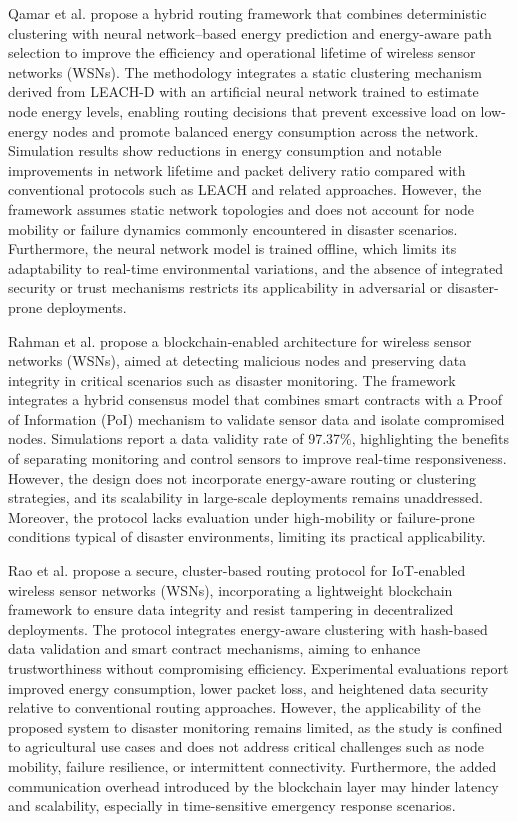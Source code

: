 Qamar et al. \cite{qamar_hybrid_2025} propose a hybrid routing framework that combines deterministic clustering with neural network–based energy prediction and energy-aware path selection to improve the efficiency and operational lifetime of wireless sensor networks (WSNs). The methodology integrates a static clustering mechanism derived from LEACH-D with an artificial neural network trained to estimate node energy levels, enabling routing decisions that prevent excessive load on low-energy nodes and promote balanced energy consumption across the network. Simulation results show reductions in energy consumption and notable improvements in network lifetime and packet delivery ratio compared with conventional protocols such as LEACH and related approaches. However, the framework assumes static network topologies and does not account for node mobility or failure dynamics commonly encountered in disaster scenarios. Furthermore, the neural network model is trained offline, which limits its adaptability to real-time environmental variations, and the absence of integrated security or trust mechanisms restricts its applicability in adversarial or disaster-prone deployments.

Rahman et al. \cite{rahman_distributed_2025} propose a blockchain-enabled architecture for wireless sensor networks (WSNs), aimed at detecting malicious nodes and preserving data integrity in critical scenarios such as disaster monitoring. The framework integrates a hybrid consensus model that combines smart contracts with a Proof of Information (PoI) mechanism to validate sensor data and isolate compromised nodes. Simulations report a data validity rate of 97.37\%, highlighting the benefits of separating monitoring and control sensors to improve real-time responsiveness. However, the design does not incorporate energy-aware routing or clustering strategies, and its scalability in large-scale deployments remains unaddressed. Moreover, the protocol lacks evaluation under high-mobility or failure-prone conditions typical of disaster environments, limiting its practical applicability.

Rao et al. \cite{rao_optimized_2024} propose a secure, cluster-based routing protocol for IoT-enabled wireless sensor networks (WSNs), incorporating a lightweight blockchain framework to ensure data integrity and resist tampering in decentralized deployments. The protocol integrates energy-aware clustering with hash-based data validation and smart contract mechanisms, aiming to enhance trustworthiness without compromising efficiency. Experimental evaluations report improved energy consumption, lower packet loss, and heightened data security relative to conventional routing approaches. However, the applicability of the proposed system to disaster monitoring remains limited, as the study is confined to agricultural use cases and does not address critical challenges such as node mobility, failure resilience, or intermittent connectivity. Furthermore, the added communication overhead introduced by the blockchain layer may hinder latency and scalability, especially in time-sensitive emergency response scenarios.

